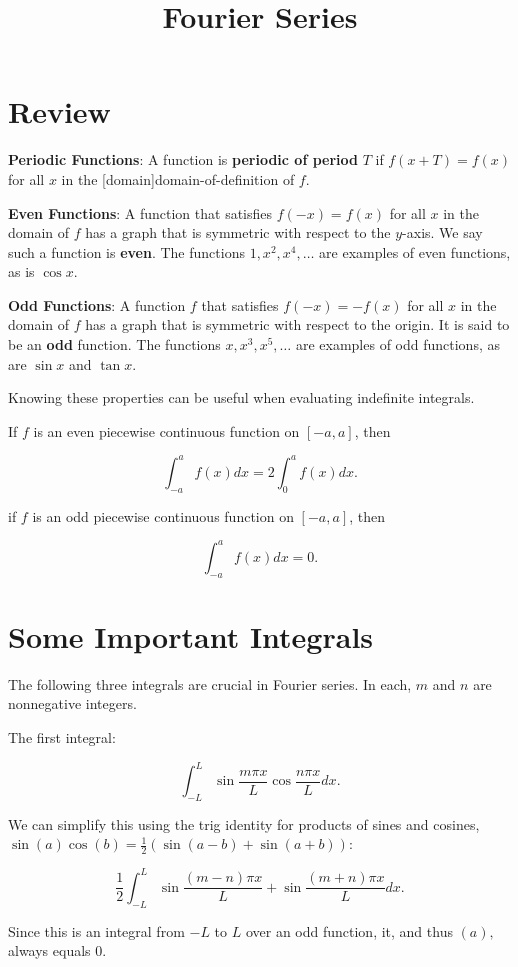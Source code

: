 \documentclass{article}
\title{Fourier Series}
\begin{document}
\section{Review}

\textbf{Periodic Functions}: A function is \textbf{periodic of period} $T$ if $f(x + T) = f(x)$ for all $x$ in the \@[domain]{domain-of-definition} of $f$.

\textbf{Even Functions}: A function that satisfies $f(-x) = f(x)$ for all $x$ in the domain of $f$ has a graph that is symmetric with respect to the $y$-axis. We say such a function is \textbf{even}. The functions $1, x^2, x^4,\dots$ are examples of even functions, as is $\cos{x}$.

\textbf{Odd Functions}: A function $f$ that satisfies $f(-x) = -f(x)$ for all $x$ in the domain of $f$ has a graph that is symmetric with respect to the origin. It is said to be an \textbf{odd} function. The functions $x, x^3, x^5, \dots$ are examples of odd functions, as are $\sin{x}$ and $\tan{x}$.

Knowing these properties can be useful when evaluating indefinite integrals.

If $f$ is an even piecewise continuous function on $[-a, a]$, then

\[ \int_{-a}^{a} f(x) dx = 2 \int_0^{a} f(x) dx. \]

if $f$ is an odd piecewise continuous function on $[-a, a]$, then

\[ \int_{-a}^{a} f(x) dx = 0. \]

\section{Some Important Integrals}

The following three integrals are crucial in Fourier series. In each, $m$ and $n$ are nonnegative \@{integers}.

The first integral:

\[ \int_{-L}^{L} \sin{\frac{m \pi x}{L}} \cos{\frac{n \pi x}{L}} dx. \tag{a} \]

We can simplify this using the trig identity for products of sines and cosines, $\sin{(a)}\cos{(b)} = \frac{1}{2}(\sin{(a - b)} + \sin{(a+b)}):$

\[ \frac{1}{2}  \int_{-L}^{L} \sin{\frac{(m-n) \pi x}{L}} + \sin{\frac{(m+n)\pi x}{L}} dx. \]

Since this is an integral from $-L$ to $L$ over an odd function, it, and thus $(a),$ always equals 0.
\end{document}
